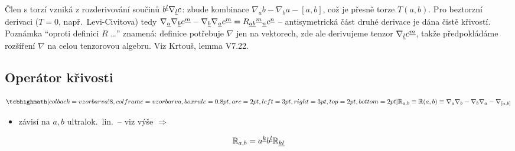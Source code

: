\begin{vysvetleni}
Člen s torzí vzniká z rozderivování součinů $b^{\underline{l}}\nabla_{\underline{l}}c$: zbude kombinace $\nabla_a b-\nabla_b a-[a,b]$, což je přesně torze $T(a,b)$. Pro beztorzní derivaci ($T=0$, např.\ Levi-Civitova) tedy
$\nabla_{\underline{a}}\nabla_{\underline{b}}c^{\underline{m}}-\nabla_{\underline{b}}\nabla_{\underline{a}}c^{\underline{m}}=R_{\underline{ab}}{}^{\underline{m}}{}_{\underline{n}}c^{\underline{n}}$ -- antisymetrická část druhé derivace je dána čistě křivostí.
Poznámka ``oproti definici $R$ \dots'' znamená: definice potřebuje $\nabla$ jen na vektorech, zde ale derivujeme tenzor $\nabla_{\underline{l}}c^{\underline{m}}$, takže předpokládáme rozšíření $\nabla$ na celou tenzorovou algebru. Viz Krtouš, lemma V7.22.
\end{vysvetleni}

\subsection*{Operátor křivosti}
\begin{definice}
\[
  \vzorec{\gmIjedenactAR_{a,b} \equiv \gmIjedenactAR(a,b) \equiv \nabla_a\nabla_b - \nabla_b\nabla_a - \nabla_{[a,b]}}
\]
\end{definice}
\begin{itemize}[nosep]
  \item[--] závisí na $a,b$ ultralok.\ lin.\ -- viz výše \quad $\Rightarrow$
\end{itemize}
\[
  \mathbb{R}_{a,b} = a^{\underline{k}}b^{\underline{l}}\mathbb{R}_{\underline{kl}}
\]

